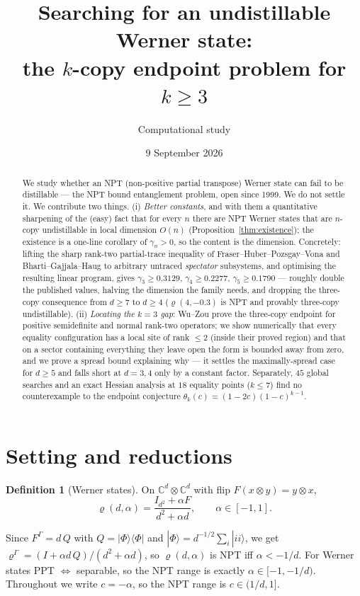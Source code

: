 \documentclass[11pt]{article}
\title{Searching for an undistillable Werner state:\\
the $k$-copy endpoint problem for $k\ge 3$}
\author{Computational study}
\date{9 September 2026}
\theoremstyle{definition}
\newtheorem{definition}{Definition}
\theoremstyle{plain}
\newcommand{\CC}{\mathbb{C}}
\begin{document}
\maketitle

\begin{abstract}
We study whether an NPT (non-positive partial transpose) Werner state can fail to be
distillable --- the NPT bound entanglement problem, open since 1999. We do not settle it.
We contribute two things. (i) \emph{Better constants}, and with them a quantitative
sharpening of the (easy) fact that for every $n$ there are NPT Werner states that are
$n$-copy undistillable in local dimension $O(n)$ (Proposition~\ref{thm:existence}); the
existence is a one-line corollary of $\gamma_n>0$, so the content is the dimension. Concretely: lifting the
sharp rank-two partial-trace inequality of Fraser--Huber--Pozsgay--Vona and
Bharti--Gajjala--Haug to arbitrary untraced \emph{spectator} subsystems, and optimising the
resulting linear program, gives $\gamma_3\ge0.3129$, $\gamma_4\ge0.2277$,
$\gamma_5\ge0.1790$ --- roughly double the published values, halving the dimension the
family needs, and dropping the three-copy consequence from $d\ge7$ to $d\ge4$
($\varrho(4,-0.3)$ is NPT and provably three-copy undistillable). (ii) \emph{Locating the
$k=3$ gap}: Wu--Zou prove the three-copy endpoint for positive semidefinite and normal
rank-two operators; we show numerically that every equality configuration has a local site
of rank $\le2$ (inside their proved region) and that on a sector containing everything they
leave open the form is bounded away from zero, and we prove a spread bound explaining why
--- it settles the maximally-spread case for $d\ge5$ and falls short at $d=3,4$ only by a
constant factor. Separately, $45$ global searches and an exact Hessian analysis at $18$
equality points ($k\le7$) find no counterexample to the endpoint conjecture
$\theta_k(c)=(1-2c)(1-c)^{k-1}$.
\end{abstract}

\section{Setting and reductions}

\begin{definition}[Werner states]
On $\CC^d\otimes\CC^d$ with flip $F(x\otimes y)=y\otimes x$,
\[
\varrho(d,\alpha)=\frac{I_{d^2}+\alpha F}{d^2+\alpha d},\qquad \alpha\in[-1,1].
\]
\end{definition}
Since $F^\Gamma=d\,Q$ with $Q=|\Phi\rangle\langle\Phi|$ and
$|\Phi\rangle=d^{-1/2}\sum_i|ii\rangle$, we get
$\varrho^\Gamma=(I+\alpha d\,Q)/(d^2+\alpha d)$, so $\varrho(d,\alpha)$ is NPT iff
$\alpha<-1/d$. For Werner states PPT $\Leftrightarrow$ separable, so the NPT range is
exactly $\alpha\in[-1,-1/d)$. Throughout we write $c=-\alpha$, so the NPT range is
$c\in(1/d,1]$.
\end{document}
